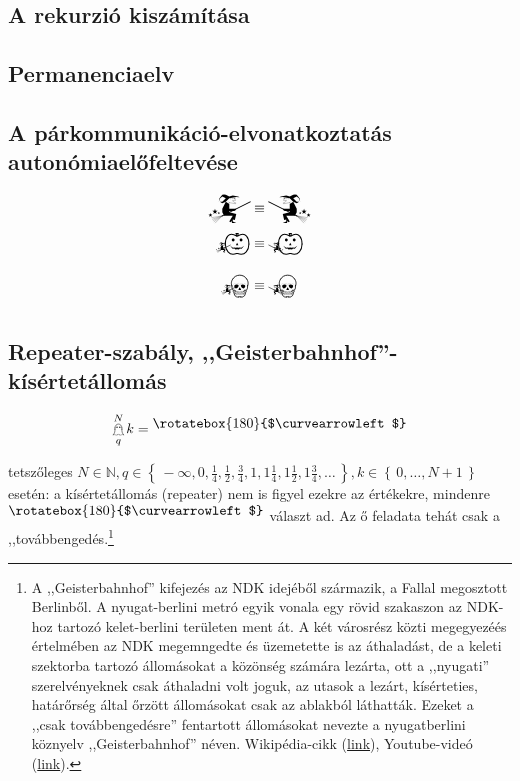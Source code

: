 \documentclass{article}
\newcommand{\nothing}{\text{\raisebox{0.4em}{\rotatebox{180}{$\curvearrowleft$}}}}%
\newcommand{\setOf}[1]{\left\lbrace\,#1\,\right\rbrace}
\newcommand{\nomainfunA}[3]{{}_{\mathwitch}\!\!\!\!\bigskull^{#1}_{#2}#3}
\newcommand{\nomainfunB}[3]{{}_{\reversemathwitch}\!\!\!\!\bigskull^{#1}_{#2}#3}
\newcommand{\yesmainfunA}[3]{{}_{\mathwitch}\!\!\!\!\bigpumpkin^{#1}_{#2}#3}
\newcommand{\yesmainfunB}[3]{{}_{\reversemathwitch}\!\!\!\!\bigpumpkin^{#1}_{#2}#3}
\newcommand{\currymainfunA}{\mathwitch}
\newcommand{\currymainfunB}{\reversemathwitch}
\newcommand{\gbh}[3]{\mathop{\mathghost}^{#1}_{#2}#3}
\begin{document}
	\subsection{A rekurzió kiszámítása}



	\subsection{Permanenciaelv}

	\subsection{A párkommunikáció-elvonatkoztatás autonómiaelőfeltevése}

	\begin{align}
		\currymainfunA     &\equiv \currymainfunB     \\
		\yesmainfunA{}{}{} &\equiv \yesmainfunB{}{}{} \\
		\nomainfunA{}{}{}  &\equiv \nomainfunB{}{}{}
	\end{align}

	\subsection{Repeater-szabály, ,,Geisterbahnhof''-kísértetállomás}

	\begin{displaymath}
		\gbh Nqk = \nothing
	\end{displaymath}

	tetszőleges $N \in \mathbb N, q \in \setOf{-\infty, 0, \frac14, \frac12, \frac34, 1, 1\frac14, 1\frac12, 1\frac34, \dots}, k \in \setOf{0, \dots, N + 1}$ esetén: a kísértetállomás (repeater) nem is figyel ezekre az értékekre, mindenre $\nothing$ választ ad. Az ő feladata tehát csak a ,,továbbengedés.\footnote{A ,,Geisterbahnhof'' kifejezés az NDK idejéből származik, a Fallal megosztott Berlinből. A nyugat-berlini metró egyik vonala  egy rövid szakaszon az NDK-hoz tartozó kelet-berlini területen ment át. A két városrész közti megegyezéés értelmében az NDK megemngedte és üzemetette is az áthaladást, de a keleti szektorba tartozó állomásokat a közönség számára lezárta, ott a ,,nyugati'' szerelvényeknek csak áthaladni volt joguk, az utasok a lezárt, kísérteties, határőrség által őrzött állomásokat csak az ablakból láthatták. Ezeket a ,,csak továbbengedésre'' fentartott állomásokat nevezte a nyugatberlini köznyelv ,,Geisterbahnhof'' néven. Wikipédia-cikk (\href{https://en.wikipedia.org/wiki/Ghost_station}{link}), Youtube-videó (\href{https://www.youtube.com/watch?v=jSwbcCx8rfQ}{link}).}
\end{document}
